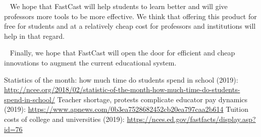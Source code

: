 \documentclass[10pt, a4paper]{article}
\begin{document}
\par ~ We hope that FastCast will help students to learn better and will give professors more tools to be more effective. We think that offering this product for free for students and at a relatively cheap cost for professors and institutions will help in that regard.

\par ~ Finally, we hope that FastCast will open the door for efficient and cheap innovations to augment the current educational system.
	
\begin{thebibliography}{9}
Statistics of the month: how much time do students spend in school (2019): \url{http://ncee.org/2018/02/statistic-of-the-month-how-much-time-do-students-spend-in-school/}
Teacher shortage, protests complicate educator pay dynamics (2019): \url{https://www.apnews.com/0b3ea7528682452cb20ea797caa2b614}
Tuition costs of college and universities (2019):
\url{https://nces.ed.gov/fastfacts/display.asp?id=76}
\end{thebibliography}
\end{document}
